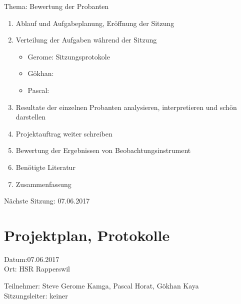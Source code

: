 Thema: Bewertung der Probanten
\begin{enumerate}

\item Ablauf und Aufgabeplanung, Eröffnung der Sitzung 

\item  Verteilung der Aufgaben während der Sitzung
\begin{itemize}
\item Gerome: Sitzungsprotokole
\item Gökhan: 
\item Pascal: 
\end{itemize}



\item Resultate der einzelnen Probanten analysieren, interpretieren und schön darstellen 		

\item 	Projektauftrag weiter schreiben

\item 	Bewertung der Ergebnissen von Beobachtungsinstrument


\item Benötigte Literatur

\item Zusammenfassung

\end{enumerate}

Nächste Sitzung: 07.06.2017

\newpage
\section*{Projektplan, Protokolle}

Datum:07.06.2017\\
Ort: HSR Rapperswil

Teilnehmer: Steve Gerome Kamga, Pascal Horat, Gökhan Kaya\\
Sitzungsleiter: keiner

